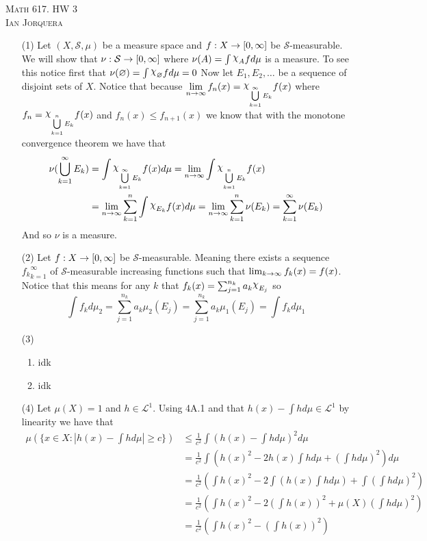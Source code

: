 \documentclass[12pt]{amsart}
\DeclareRobustCommand{\rchi}{{\mathpalette\irchi\relax}}
\newcommand{\irchi}[2]{\raisebox{\depth}{$#1\chi$}} %
\begin{document}
\begin{center}
   \textsc{Math 617. HW 3\\ Ian Jorquera}
\end{center}
\vspace{1em}

\begin{itemize}
   \item[(1)] Let $(X,\mathcal S,\mu)$ be a measure space and $f:X\rightarrow [0,\infty]$ be 
   $\mathcal S$-measurable. We will show that $\nu:\mathcal S\rightarrow [0,\infty]$ where 
   $\nu(A)=\int \rchi_{A}f d\mu$ is a measure.
   To see this notice first that $\nu(\emptyset)=\int \rchi_{\emptyset}f d\mu= 0$
   Now let $E_1,E_2,\dots$ be a sequence of disjoint sets of $X$. Notice that because 
   $\lim\limits_{n\ra\infty}f_n(x)=\rchi_{\bigcup\limits_{k=1}^\infty E_k}f(x)$ where $f_n=\rchi_{\bigcup\limits_{k=1}^n E_k}f(x)$ and
   $f_n(x)\leq f_{n+1}(x)$ we know that with the monotone convergence theorem we have that
   \begin{align*}
      \nu(\bigcup_{k=1}^{\infty} E_k)&=\int \rchi_{\bigcup\limits_{k=1}^\infty E_k}f(x)d\mu=\lim_{n\ra\infty}\int\rchi_{\bigcup\limits_{k=1}^n E_k}f(x)\\
      &=\lim_{n\ra\infty}\sum_{k=1}^n\int\rchi_{E_k}f(x)d\mu=\lim_{n\ra\infty}\sum_{k=1}^n\nu(E_k)=\sum_{k=1}^\infty\nu(E_k)
   \end{align*}
   And so $\nu$ is a measure.


   \item[(2)] Let $f:X\rightarrow[0,\infty]$ be $\mathcal S$-measurable. Meaning there exists a sequence 
   ${f_k}_{k=1}^\infty$ of $\mathcal S$-measurable increasing functions such that $\lim_{k\rightarrow \infty}f_k(x)=f(x)$.
   Notice that this means for any $k$ that $f_k(x)=\sum_{j=1}^{n_k}a_{k}\rchi_{E_j}$ so 
   \[\int f_k d\mu_2=\sum_{j=1}^{n_k}a_{k}\mu_2({E_j})=\sum_{j=1}^{n_k}a_{k}\mu_1({E_j})=\int f_k d\mu_1\]


   \item[(3)]
   \begin{enumerate}[label= (\alph*)]
      \item idk 
      \item idk
   \end{enumerate}

   \item[(4)] Let $\mu(X)=1$ and $h\in\mathcal L^1$. Using 4A.1 and that 
   $h(x)-\int hd\mu\in\mathcal L^1$ by linearity we have that
   \begin{align*}\mu(\{x\in X:|h(x)-\int h d\mu|\geq c\})&\leq\frac{1}{c^2}\int(h(x)-\int hd\mu)^2d\mu\\
   &=\frac{1}{c^2}\int \left(h(x)^2-2h(x)\int hd\mu+\left(\int hd\mu\right)^2\right)d\mu\\
   &=\frac{1}{c^2}\left(\int h(x)^2-2\int \left(h(x)\int hd\mu\right)+\int\left(\int hd\mu\right)^2\right)\\
   &=\frac{1}{c^2}\left(\int h(x)^2-2\left(\int h(x)\right)^2+\mu(X)\left(\int hd\mu\right)^2\right)\\
   &=\frac{1}{c^2}\left(\int h(x)^2-\left(\int h(x)\right)^2\right)\\
   \end{align*}


\end{itemize}
\end{document}
